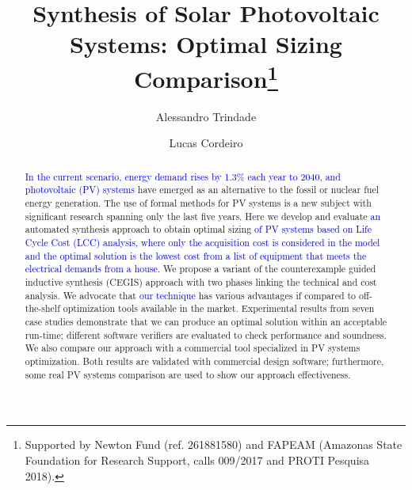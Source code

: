 \documentclass[runningheads]{llncs}
\begin{document}
%
\title{Synthesis of Solar Photovoltaic Systems: Optimal Sizing Comparison\thanks{Supported by Newton Fund (ref. 261881580) and FAPEAM (Amazonas State Foundation for Research Support, calls 009/2017 and PROTI Pesquisa 2018).}}
%
%
\author{Alessandro Trindade \and Lucas Cordeiro} %
%
%
\maketitle       %


\begin{abstract}
\textcolor{blue}{In the current scenario, energy demand rises by 1.3\% each year to 2040, and photovoltaic (PV) systems} have emerged as an alternative to the fossil or nuclear fuel energy generation. The use of formal methods for PV systems is a new subject with significant research spanning only the last five years. Here we develop and evaluate \textcolor{blue}{an} automated synthesis approach to obtain optimal sizing \textcolor{blue}{of PV systems based on Life Cycle Cost (LCC) analysis, where only the acquisition cost is considered in the model and the optimal solution is the lowest cost from a list of equipment that meets the electrical demands from a house}. 
We propose a variant of the counterexample guided inductive synthesis (CEGIS) approach with two phases linking the technical and cost analysis. We advocate that \textcolor{blue}{our technique} has various advantages if compared to off-the-shelf optimization tools available in the market. Experimental results from seven case studies demonstrate that we can produce an optimal solution within an acceptable run-time; different software verifiers are evaluated to check performance and soundness. We also compare our approach with a commercial tool specialized in PV systems optimization. Both results are validated with commercial design software; furthermore, some real PV systems comparison are used to show our approach effectiveness. 
\end{abstract}
\end{document}
